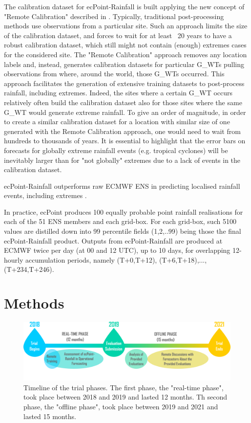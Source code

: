 \documentclass[twocol]{ametsocV5} %
\begin{document}
The calibration dataset for ecPoint-Rainfall is built applying the new concept of "Remote Calibration" described in \citet{Hewson2020a}. Typically, traditional post-processing methods use observations from a particular site. Such an approach limits the size of the calibration dataset, and forces to wait for at least ~20 years to have a robust calibration dataset, which still might not contain (enough) extremes cases for the considered site. The "Remote Calibration" approach removes any location labels and, instead, generates calibration datasets for particular G\_WTs pulling observations from where, around the world, those G\_WTs occurred. This approach facilitates the generation of extensive training datasets to post-process rainfall, including extremes. Indeed, the sites where a certain G\_WT occurs relatively often build the calibration dataset also for those sites where the same G\_WT would generate extreme rainfall. To give an order of magnitude, in order to create a similar calibration dataset for a location with similar size of one generated with the Remote Calibration approach, one would need to wait from hundreds to thousands of years. It is essential to highlight that the error bars on forecasts for globally extreme rainfall events (e.g. tropical cyclones) will be inevitably larger than for "not globally" extremes due to a lack of events in the calibration dataset. \par
 ecPoint-Rainfall outperforms raw ECMWF ENS in predicting localised rainfall events, including extremes \citet{Hewson2020a}. \par
In practice, ecPoint produces 100 equally probable point rainfall realisations for each of the 51 ENS members and each grid-box. For each grid-box, such 5100 values are distilled down into 99 percentile fields (1,2,..99) being those the final ecPoint-Rainfall product. Outputs from ecPoint-Rainfall are produced at ECMWF twice per day (at 00 and 12 UTC), up to 10 days, for overlapping 12-hourly accumulation periods, namely (T+0,T+12), (T+6,T+18),...,(T+234,T+246).


\section{Methods} 


\begin{figure}
\centerline{\includegraphics[width=39pc]{manuscript/Figures/Fig3.png}}
\caption{Timeline of the trial phases. The first phase, the "real-time phase", took place between 2018 and 2019 and lasted 12 months. Th second phase, the "offline phase", took place between 2019 and 2021 and lasted 15 months.}
\label{Fig3}
\end{figure}
\end{document}
